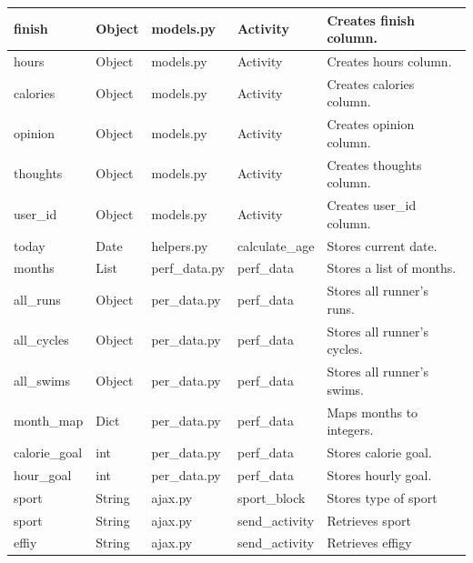 \documentclass{article}[12pt,a4paper]
\begin{document}
\begin{longtable}{|l|l|l|l|l|}
finish          & Object        & models.py           & Activity                & Creates finish column.      \\ \hline
hours           & Object        & models.py           & Activity                & Creates hours column.       \\ \hline
calories        & Object        & models.py           & Activity                & Creates calories column.    \\ \hline
opinion         & Object        & models.py           & Activity                & Creates opinion column.     \\ \hline
thoughts        & Object        & models.py           & Activity                & Creates thoughts column.    \\ \hline
user\_id        & Object        & models.py           & Activity                & Creates user\_id column.    \\ \hline
today           & Date          & helpers.py          & calculate\_age          & Stores current date.        \\ \hline
months          & List          & perf\_data.py       & perf\_data              & Stores a list of months.        \\ \hline
all\_runs       & Object        & per\_data.py        & perf\_data              & Stores all runner's runs.     \\ \hline
all\_cycles     & Object        & per\_data.py        & perf\_data              & Stores all runner's cycles.   \\ \hline
all\_swims      & Object        & per\_data.py        & perf\_data              & Stores all runner's swims.    \\ \hline
month\_map      & Dict          & per\_data.py        & perf\_data              & Maps months to integers.        \\ \hline
calorie\_goal   & int           & per\_data.py        & perf\_data              & Stores calorie goal.        \\ \hline
hour\_goal      & int           & per\_data.py        & perf\_data              & Stores hourly goal.         \\ \hline
sport             & String      & ajax.py        & sport\_block        & Stores type of sport                \\ \hline
sport             & String      & ajax.py        & send\_activity      & Retrieves sport                     \\ \hline
effiy             & String      & ajax.py        & send\_activity      & Retrieves effigy                    \\ \hline

\end{longtable}
\end{document}
